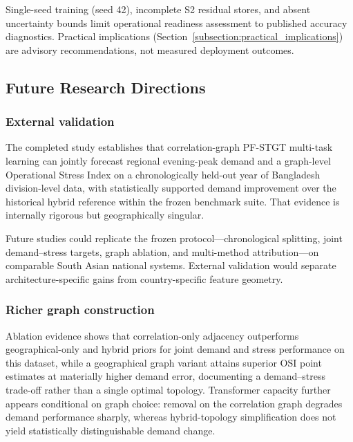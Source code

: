 Single-seed training (seed 42), incomplete S2 residual stores, and absent uncertainty bounds limit operational readiness assessment to published accuracy diagnostics. Practical implications (Section~\ref{subsection:practical_implications}) are advisory recommendations, not measured deployment outcomes.

\subsection{Future Research Directions}\label{subsection:future_research_directions}

\subsubsection{External validation}\label{subsubsection:external_validation}

The completed study establishes that correlation-graph PF-STGT multi-task learning can jointly forecast regional evening-peak demand and a graph-level Operational Stress Index on a chronologically held-out year of Bangladesh division-level data, with statistically supported demand improvement over the historical hybrid reference within the frozen benchmark suite. That evidence is internally rigorous but geographically singular.

Future studies could replicate the frozen protocol---chronological splitting, joint demand--stress targets, graph ablation, and multi-method attribution---on comparable South Asian national systems. External validation would separate architecture-specific gains from country-specific feature geometry.

\subsubsection{Richer graph construction}\label{subsubsection:richer_graph_construction}

Ablation evidence shows that correlation-only adjacency outperforms geographical-only and hybrid priors for joint demand and stress performance on this dataset, while a geographical graph variant attains superior OSI point estimates at materially higher demand error, documenting a demand--stress trade-off rather than a single optimal topology. Transformer capacity further appears conditional on graph choice: removal on the correlation graph degrades demand performance sharply, whereas hybrid-topology simplification does not yield statistically distinguishable demand change.

